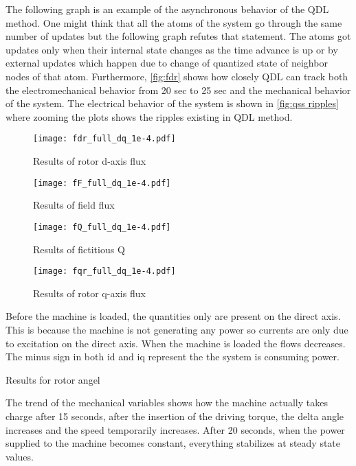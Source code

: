 \documentclass{scspaperproc}
\theoremstyle{scsthe}
\begin{document}
The following graph is an example of the asynchronous behavior of the QDL method. One might think that all the atoms of the system go through the same number of updates but the following graph refutes that statement. The atoms got updates only when their internal state changes as the time advance is up or by external updates which happen due to change of quantized state of neighbor nodes of that atom. Furthermore, \autoref{fig:fdr} shows how closely QDL can track both the electromechanical behavior from 20 sec to 25 sec and the mechanical behavior of the system. The electrical behavior of the system is shown in \autoref{fig:qss ripples} where zooming the plots shows the ripples existing in QDL method. 

 \begin{figure}[H]
 \FloatBarrier
    \centering
    \texttt{[image: fdr\_full\_dq\_1e-4.pdf]}
    \caption{Results of rotor d-axis flux}
    \label{fig:fdr}
\end{figure}

 \begin{figure}[H]
 \FloatBarrier
    \centering
    \texttt{[image: fF\_full\_dq\_1e-4.pdf]}
    \caption{Results of field flux}
    \label{fig:filed current flux}
\end{figure}


 \begin{figure}[H]
 \FloatBarrier
    \centering
    \texttt{[image: fQ\_full\_dq\_1e-4.pdf]}
    \caption{Results of fictitious Q}
    \label{fig:fQ}
\end{figure}

 \begin{figure}[H]
 \FloatBarrier
    \centering
    \texttt{[image: fqr\_full\_dq\_1e-4.pdf]}
    \caption{Results of rotor q-axis flux}
    \label{fig:fqr}
\end{figure}

Before the machine is loaded, the quantities only are present on the direct axis. This is because the machine is not generating any power so currents are only due to excitation on the direct axis. When the machine is loaded the flows decreases. The minus sign in both id and iq represent the the system is consuming power. 

Results for rotor angel

The trend of the mechanical variables shows how the machine actually takes charge after 15 seconds, after the insertion of the driving torque, the delta angle increases and the speed temporarily increases. After 20 seconds, when the power supplied to the machine becomes constant, everything stabilizes at steady state values.
\end{document}
